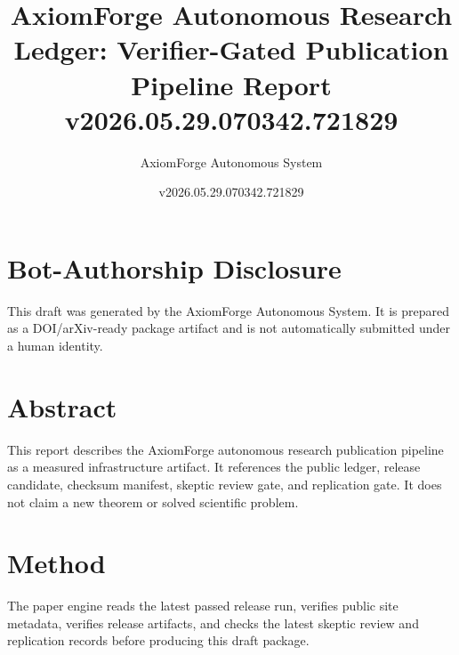 \documentclass[11pt]{article}
\title{AxiomForge Autonomous Research Ledger: Verifier-Gated Publication Pipeline Report v2026.05.29.070342.721829}
\author{AxiomForge Autonomous System}
\date{v2026.05.29.070342.721829}
\begin{document}
\maketitle

\section*{Bot-Authorship Disclosure}
This draft was generated by the AxiomForge Autonomous System. It is prepared as
a DOI/arXiv-ready package artifact and is not automatically submitted under a
human identity.

\section*{Abstract}
This report describes the AxiomForge autonomous research publication pipeline
as a measured infrastructure artifact. It references the public ledger,
release candidate, checksum manifest, skeptic review gate, and replication gate.
It does not claim a new theorem or solved scientific problem.

\section*{Method}
The paper engine reads the latest passed release run, verifies public site
metadata, verifies release artifacts, and checks the latest skeptic review and
replication records before producing this draft package.
\end{document}
